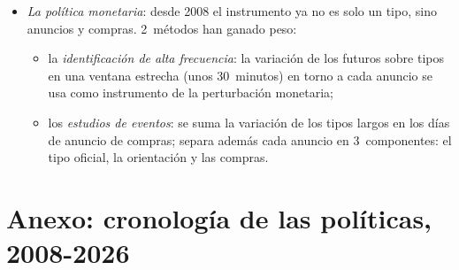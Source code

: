 \documentclass[11pt]{article}
\begin{document}
\begin{itemize}
\item \emph{La política monetaria}: desde 2008 el instrumento ya no es solo un tipo, sino anuncios y compras. 2~métodos han ganado peso:
  \begin{itemize}
  \item la \emph{identificación de alta frecuencia}: la variación de los futuros sobre tipos en una ventana estrecha (unos 30~minutos) en torno a cada anuncio se usa como instrumento de la perturbación monetaria\nocite{GertlerKaradi2015Monetary};
  \item los \emph{estudios de eventos}: se suma la variación de los tipos largos en los días de anuncio de compras\nocite{GagnonEtAl2011Financial}; \textcite{Swanson2021Measuring} separa además cada anuncio en 3~componentes: el tipo oficial, la orientación y las compras.
  \end{itemize}
\end{itemize}

\section{Anexo: cronología de las políticas, 2008-2026}\label{anexo:cronologia}
\end{document}
